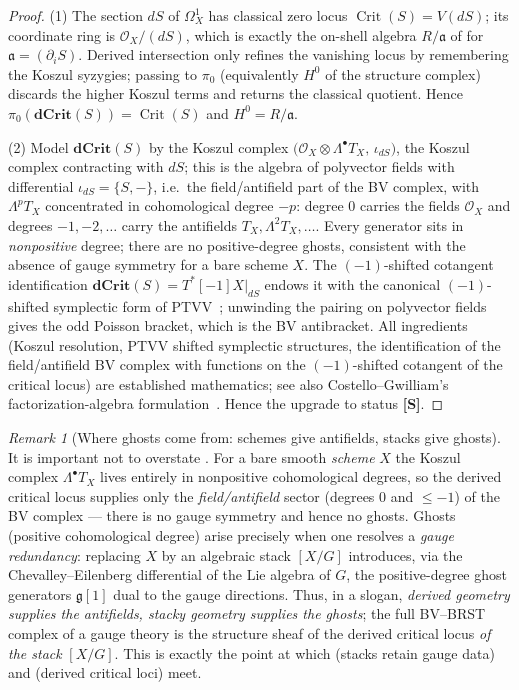 \documentclass[12pt]{article}
\theoremstyle{definition}
\theoremstyle{remark}
\newtheorem{remark}[theorem]{Remark}
\newcommand{\Ideal}{\mathfrak{a}}
\newcommand{\Crit}{\operatorname{Crit}}
\newcommand{\dCrit}{\mathbf{dCrit}}
\newcommand{\Ohm}{\mathcal{O}}
\newcommand{\status}[1]{\textnormal{\textsf{\textbf{[#1]}}}}
\begin{document}
\begin{proof}
(1) The section $dS$ of $\Omega^1_X$ has classical zero locus $\Crit(S)=V(dS)$; its coordinate ring is
$\Ohm_X/(dS)$, which is exactly the on-shell algebra $R/\Ideal$ of  for
$\Ideal=(\partial_i S)$. Derived intersection only refines the vanishing locus by remembering the Koszul
syzygies; passing to $\pi_0$ (equivalently $H^0$ of the structure complex) discards the higher Koszul
terms and returns the classical quotient. Hence $\pi_0(\dCrit(S))=\Crit(S)$ and $H^0=R/\Ideal$.

(2) Model $\dCrit(S)$ by the Koszul complex $\bigl(\Ohm_X\otimes \Lambda^\bullet T_X,\, \iota_{dS}\bigr)$,
the Koszul complex contracting with $dS$; this is the algebra of polyvector fields with differential
$\iota_{dS}=\{S,-\}$, i.e.\ the field/antifield part of the BV complex, with $\Lambda^p T_X$ concentrated
in cohomological degree $-p$: degree $0$ carries the fields $\Ohm_X$ and degrees $-1,-2,\dots$ carry the
antifields $T_X,\Lambda^2 T_X,\dots$. Every generator sits in \emph{nonpositive} degree; there are no
positive-degree ghosts, consistent with the absence of gauge symmetry for a bare scheme $X$. The
$(-1)$-shifted cotangent identification $\dCrit(S)=T^\ast[-1]X|_{dS}$ endows it with the canonical
$(-1)$-shifted symplectic form of PTVV~\cite{ptvv}; unwinding the pairing on polyvector fields gives the
odd Poisson bracket, which is the BV antibracket. All ingredients (Koszul resolution, PTVV shifted
symplectic structures, the identification of the field/antifield BV complex with functions on the
$(-1)$-shifted cotangent of the critical locus) are established mathematics; see also Costello--Gwilliam's
factorization-algebra formulation~\cite{costellogwilliam}. Hence the upgrade to status \status{S}.
\end{proof}

\begin{remark}[Where ghosts come from: schemes give antifields, stacks give ghosts]
\label{rem:ghosts}
It is important not to overstate . For a bare smooth \emph{scheme} $X$ the Koszul complex
$\Lambda^\bullet T_X$ lives entirely in nonpositive cohomological degrees, so the derived critical locus
supplies only the \emph{field/antifield} sector (degrees $0$ and $\le -1$) of the BV complex --- there is
no gauge symmetry and hence no ghosts. Ghosts (positive cohomological degree) arise precisely when one
resolves a \emph{gauge redundancy}: replacing $X$ by an algebraic stack $[X/G]$ introduces, via the
Chevalley--Eilenberg differential of the Lie algebra of $G$, the positive-degree ghost generators
$\mathfrak g[1]$ dual to the gauge directions. Thus, in a slogan, \emph{derived geometry supplies the
antifields, stacky geometry supplies the ghosts}; the full BV--BRST complex of a gauge theory is the
structure sheaf of the derived critical locus \emph{of the stack} $[X/G]$. This is exactly the point at
which  (stacks retain gauge data) and  (derived critical loci) meet.
\end{remark}
\end{document}
